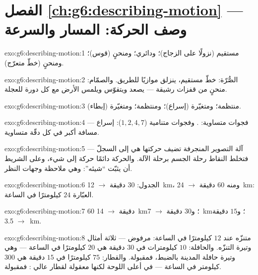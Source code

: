 \section*{الفصل \ref{ch:g6:describing-motion} --- وصف الحركة: المسار والسرعة}

\begin{solution}{exo:g6:describing-motion:1}
مستقيم (نزولًا على الزجاج)؛ ودائري؛ ومنحنٍ (قوس)؛ ومنحنٍ (خطّ
متعرّج).
\end{solution}

\begin{solution}{exo:g6:describing-motion:2}
الصُّرّة: خطّ مستقيم، ينزلق موازيًا للطريق. والصمّام: منحنٍ من
قفزات رشيقة --- يصعد ويتقوّس ويلمس الأرض مع كل دورة للعجلة.
\end{solution}

\begin{solution}{exo:g6:describing-motion:3}
منتظمة؛ ومتغيّرة (إسراع)؛ ومنتظمة؛ ومتغيّرة (إبطاء).
\end{solution}

\begin{solution}{exo:g6:describing-motion:4}
فجوات متساوية: . وفجوات متنامية ($1, 2, 4, 7$):
إسراع --- مسافة أكبر في كل دقّة متساوية.
\end{solution}

\begin{solution}{exo:g6:describing-motion:5}
آلة التصوير المنجرفة تضيف حركتها هي إلى السجلّ --- فتخلط النقاط
رحلة الجسم برحلة الآلة. والحركة دائمًا حركة  إلى شيء،
وعلى الشريط أن يثبّت ``شيئه'': وهي ملاحظة وجهات النظر.
\end{solution}

\begin{solution}{exo:g6:describing-motion:6}
الجدول: $30$ دقيقة $\to$ \qty{12}{km}، ومنه $60$ دقيقة $\to$
\qty{24}{km}:  العبّارة $24$ كيلومترًا في الساعة.
\end{solution}

\begin{solution}{exo:g6:describing-motion:7}
$60$ دقيقة $\to$ \qty{14}{km}؛ و$30$ دقيقة $\to$ \qty{7}{km}؛
و$15$ دقيقة $\to$ \qty{3.5}{km}.
\end{solution}

\begin{solution}{exo:g6:describing-motion:8}
متنزّه عند $12$ كيلومترًا في الساعة: مرفوض --- ثلاثة أمثال
وتيرة التنزّه. والحافلة: $10$ كيلومترات في $30$ دقيقة هي $20$
كيلومترًا في الساعة --- وهي وتيرة حافلة المدينة بالضبط، فمقبولة.
والقطار: $75$ كيلومترًا في $15$ دقيقة هي $300$ كيلومتر في
الساعة --- في أعلى اللوحة لكنها معقولة لقطار عالي :
فمقبولة.
\end{solution}

